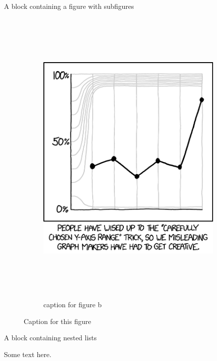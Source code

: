 \documentclass[final]{beamer}
\newlength{\colwidth}
\begin{document}
\begin{frame}[t]
\begin{columns}[t]
\begin{column}{\colwidth}
\begin{block}{A block containing a figure with subfigures}
\begin{figure}
\begin{subfigure}{0.49\textwidth}
        \includegraphics[height=15cm]{./images/y_axis_2x.png}
        \caption{caption for figure b}   %
      \end{subfigure}
      \caption{Caption for this figure}
    \end{figure}

  \end{block}

  \vspace{-1em}    %

  \begin{block}{A block containing nested lists}

    Some text here.


\end{block}
\end{column}
\end{columns}
\end{frame}
\end{document}
